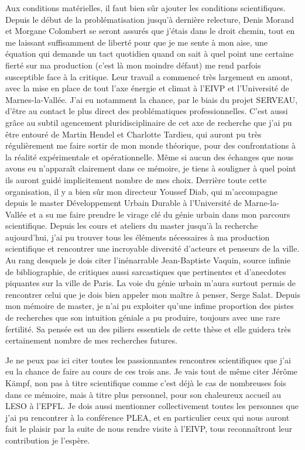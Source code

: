 Aux conditions matérielles, il faut bien sûr ajouter les conditions scientifiques. Depuis le début de la problématisation jusqu'à dernière relecture, Denis Morand et Morgane Colombert se seront assurés que j'étais dans le droit chemin, tout en me laissant suffisamment de liberté pour que je me sente à mon aise, une équation qui demande un tact quotidien quand on sait à quel point une certaine fierté sur ma production (c'est là mon moindre défaut) me rend parfois susceptible face à la critique. Leur travail a commencé très largement en amont, avec la mise en place de tout l'axe énergie et climat à l'EIVP et l'Université de Marnes-la-Vallée. J'ai eu notamment la chance, par le biais du projet SERVEAU, d'être au contact le plus direct des problématiques professionnelles. C'est aussi grâce au subtil agencement pluridisciplinaire de cet axe de recherche que j'ai pu être entouré de Martin Hendel et Charlotte Tardieu, qui auront pu très régulièrement me faire sortir de mon monde théorique, pour des confrontations à la réalité expérimentale et opérationnelle. Même si aucun des échanges que nous avons eu n’apparaît clairement dans ce mémoire, je tiens à souligner à quel point ils auront guidé implicitement nombre de mes choix. Derrière toute cette organisation, il y a bien sûr mon directeur Youssef Diab, qui m'accompagne depuis le master Développement Urbain Durable à l'Université de Marne-la-Vallée et a su me faire prendre le virage clé du génie urbain dans mon parcours scientifique. Depuis les cours et ateliers du master jusqu'à la recherche aujourd'hui, j'ai pu trouver tous les éléments nécessaires à ma production scientifique et rencontrer une incroyable diversité d'acteurs et penseurs de la ville. Au rang desquels je dois citer l’inénarrable Jean-Baptiste Vaquin, source infinie de bibliographie, de critiques aussi sarcastiques que pertinentes et d’anecdotes piquantes sur la ville de Paris. La voie du génie urbain m'aura surtout permis de rencontrer celui que je dois bien appeler mon maître à penser, Serge Salat. Depuis mon mémoire de master, je n'ai pu exploiter qu'une infime proportion des pistes de recherches que son intuition géniale a pu produire, toujours avec une rare fertilité. Sa pensée est un des piliers essentiels de cette thèse et elle guidera très certainement nombre de mes recherches futures. 

Je ne peux pas ici citer toutes les passionnantes rencontres scientifiques que j'ai eu la chance de faire au cours de ces trois ans. Je vais tout de même citer Jérôme Kämpf, non pas à titre scientifique comme c'est déjà le cas de nombreuses fois dans ce mémoire, mais à titre plus personnel, pour son chaleureux accueil au LESO à l'EPFL. Je dois aussi mentionner collectivement toutes les personnes que j'ai pu rencontrer à la conférence PLEA, et en particulier ceux qui nous auront fait le plaisir par la suite de nous rendre visite à l'EIVP, tous reconnaîtront leur contribution je l’espère.

